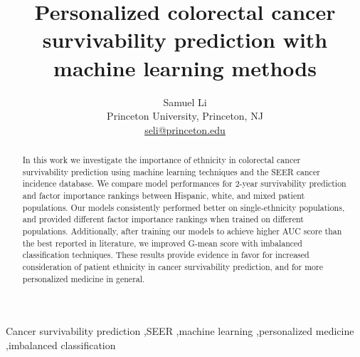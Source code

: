 \documentclass[review]{elsarticle}
\begin{document}
\begin{frontmatter}
	
\title{Personalized colorectal cancer survivability prediction with machine learning methods }
\author{Samuel Li \\ Princeton University, Princeton, NJ \\ \href{mailto:seli@princeton.edu}{seli@princeton.edu}} 






\begin{abstract}
In this work we investigate the importance of ethnicity in colorectal cancer survivability prediction using machine learning techniques and the SEER cancer incidence database. We compare model performances for 2-year survivability prediction and factor importance rankings between Hispanic, white, and mixed patient populations. Our models consistently performed better on single-ethnicity populations, and provided different factor importance rankings when trained on different populations. Additionally, after training our models to achieve higher AUC score than the best reported in literature, we improved G-mean score with imbalanced classification techniques. These results provide evidence in favor for increased consideration of patient ethnicity in cancer survivability prediction, and for more personalized medicine in general.
\end{abstract}

\begin{keyword}
Cancer survivability prediction \sep SEER \sep machine learning \sep personalized medicine \sep imbalanced classification
\end{keyword}

\end{frontmatter}
\end{document}
